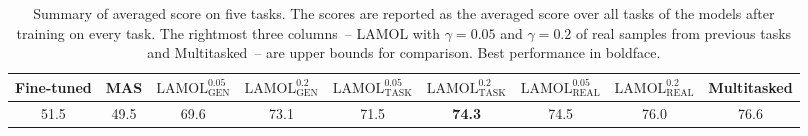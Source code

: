 \begin{table}[!tp]
\centering
    \begin{adjustbox}{max width=\textwidth}
    \begin{tabular}{*{6}{c}||ccc}
    \toprule
    \small Fine-tuned & \small MAS & \small $\text{LAMOL}_{\text{GEN}}^{0.05}$ & \small $\text{LAMOL}_{\text{GEN}}^{0.2}$ & \small $\text{LAMOL}_{\text{TASK}}^{0.05}$ & \small $\text{LAMOL}_{\text{TASK}}^{0.2}$ & \small $\text{LAMOL}_{\text{REAL}}^{0.05}$ & \small $\text{LAMOL}_{\text{REAL}}^{0.2}$ & \small Multitasked \\
    \midrule
    51.5 & 49.5 & 69.6 & 73.1 & 71.5 & \textbf{74.3} & 74.5 & 76.0 & 76.6 \\
    \bottomrule
    \end{tabular}
    \end{adjustbox}
    \caption{Summary of averaged score on five tasks. The scores are reported as the averaged score over all tasks of the models after training on every task. The rightmost three columns~-- LAMOL with $\gamma = 0.05$ and $\gamma = 0.2$ of real samples from previous tasks and Multitasked~-- are upper bounds for comparison. Best performance in boldface.}
\label{tab:five_tasks}
\end{table}

